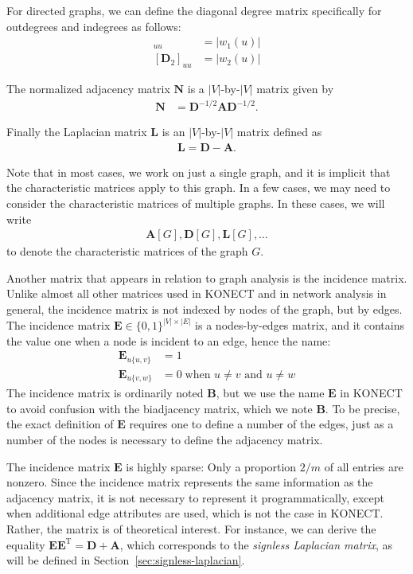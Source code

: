 \documentclass{article}
\begin{document}
For directed graphs, we can define the diagonal degree matrix
specifically for outdegrees and indegrees as follows:
\begin{align}
  [\mathbf D_1]_{uu} &= |w_1(u)| \\
  [\mathbf D_2]_{uu} &= |w_2(u)| 
\end{align}

The normalized adjacency matrix $\mathbf N$ is a $|V|$-by-$|V|$ matrix
given by
\begin{align}
  \mathbf N &= \mathbf D^{-1/2} \mathbf A \mathbf D^{-1/2}. 
\end{align}

Finally the Laplacian matrix $\mathbf L$ is an $|V|$-by-$|V|$ matrix
defined as
\begin{align}
  \mathbf L = \mathbf D - \mathbf A. 
\end{align}

Note that in most cases, we work on just a single graph, and it is
implicit that the characteristic matrices apply to this graph.  In a few
cases, we may need to consider the characteristic matrices of multiple
graphs.  In these cases, we will write
\begin{align*}
  \mathbf A[G], \mathbf D[G], \mathbf L[G], \dotsc
\end{align*}
to denote the characteristic matrices of the graph $G$. 

Another matrix that appears in relation to graph analysis is the
incidence matrix.  Unlike almost all other matrices used in KONECT and
in network analysis in general, the incidence matrix is not indexed by
nodes of the graph, but by edges.  The incidence matrix $\mathbf E \in
\{0,1\}^{|V|\times|E|}$ is a nodes-by-edges matrix, and it contains the
value one when a node is incident to an edge, hence the name:
\begin{align*}
  \mathbf E_{u \{u,v\}} &= 1 \\
  \mathbf E_{u \{v,w\}} &= 0 \;\text{when $u \neq v$ and $u \neq w$}
\end{align*}
The incidence matrix is ordinarily noted $\mathbf B$, but we use the name
$\mathbf E$ in KONECT to avoid confusion with the biadjacency matrix,
which we note $\mathbf B$. 
To be precise, the exact definition of $\mathbf E$ requires one to
define a number of the edges, just as a number of the nodes is necessary
to define the adjacency matrix. 

The incidence matrix $\mathbf E$ is highly sparse:  Only a proportion
$2/m$ of all entries are nonzero.  Since the incidence matrix represents
the same information as the adjacency matrix, it is not necessary to represent
it programmatically, except when additional edge attributes are used,
which is not the case in KONECT.  Rather, the matrix is of theoretical
interest.  For instance, we can derive the equality $\mathbf E \mathbf
E^{\mathrm T} = \mathbf D + \mathbf A$, which corresponds to the
\emph{signless Laplacian matrix}, as will be defined in
Section~\ref{sec:signless-laplacian}.  
\end{document}
